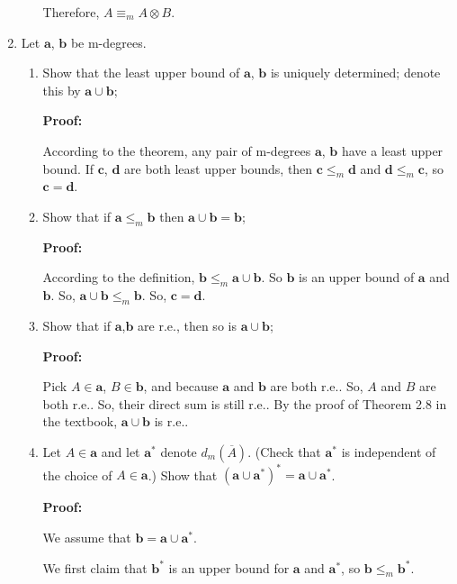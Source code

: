\documentclass[12pt,a4paper]{article}
\theoremstyle{definition}
\numberwithin{equation}{section}
\numberwithin{figure}{section}
\begin{document}
\begin{enumerate}
\begin{enumerate}
 Therefore, $A \equiv_m A \otimes B$.
    
    
  \end{enumerate}

  \item Let $\mathbf{a}$, $\mathbf{b}$ be m-degrees.
  \begin{enumerate}
  \item Show that the least upper bound of $\mathbf{a}$, $\mathbf{b}$ is uniquely determined; denote this by $\mathbf{a}\cup\mathbf{b}$;
  
  \textbf{Proof:}
  
  According to the theorem, any pair of m-degrees $\mathbf{a}$, $\mathbf{b}$ have a least upper bound. If $\mathbf{c}$, $\mathbf{d}$ are both least upper bounds, then $\mathbf{c} \leq_m \mathbf{d}$ and $\mathbf{d} \leq_m \mathbf{c}$, so $\mathbf{c} = \mathbf{d}$.
  
    \item Show that if $\mathbf{a}\leq_m\mathbf{b}$ then $\mathbf{a}\cup\mathbf{b}=\mathbf{b}$;
    
    \textbf{Proof:}
    
    According to the definition, $\mathbf{b} \leq_m \mathbf{a} \cup \mathbf{b}$. So $\mathbf{b}$ is an upper bound of $\mathbf{a}$ and $\mathbf{b}$. So, $\mathbf{a} \cup \mathbf{b} \leq_m \mathbf{b}$. So, $\mathbf{c} = \mathbf{d}$.
    
    \item Show that if $\mathbf{a}$,$\mathbf{b}$ are r.e., then so is $\mathbf{a}\cup\mathbf{b}$;
    
    \textbf{Proof:}
    
    Pick $A \in \mathbf{a}$, $B \in \mathbf{b}$, and because $\mathbf{a}$ and $\mathbf{b}$ are both r.e.. So, $A$ and $B$ are both r.e.. So, their direct sum is still r.e.. By the proof of Theorem 2.8 in the textbook, $\mathbf{a} \cup \mathbf{b}$ is r.e..
    
    \item Let $A\in \mathbf{a}$ and let $\mathbf{a}^{*}$ denote $d_m(\overline{A})$. (Check that $\mathbf{a}^{*}$ is independent of the choice of $A\in \mathbf{a}$.) Show that $(\mathbf{a}\cup\mathbf{a}^{*})^{*}=\mathbf{a}\cup\mathbf{a}^{*}$.
    
    \textbf{Proof:}
    
    We assume that $\mathbf{b} = \mathbf{a} \cup \mathbf{a}^*$.
    
    We first claim that $\mathbf{b}^*$ is an upper bound for $\mathbf{a}$ and  $\mathbf{a}^*$, so $\mathbf{b} \leq_m \mathbf{b}^*$.
    

\end{enumerate}
\end{enumerate}
\end{document}
